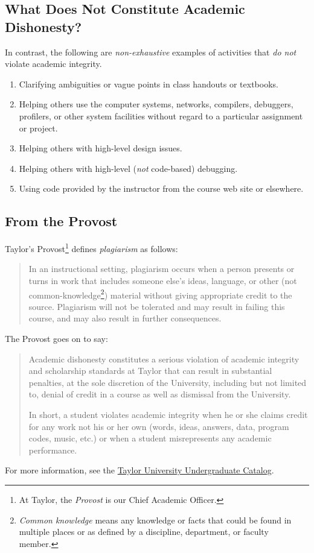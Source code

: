 \subsection{What Does Not Constitute Academic Dishonesty?}

In contrast, the following are \emph{non-exhaustive} examples of activities
that \emph{do not} violate academic integrity.

\begin{enumerate}
\item Clarifying ambiguities or vague points in class handouts or textbooks.
\item Helping others use the computer systems, networks, compilers, debuggers,
  profilers, or other system facilities without regard to a particular assignment or project.
\item Helping others with high-level design issues.
\item Helping others with high-level (\emph{not} code-based) debugging.
\item Using code provided by the instructor from the course web site or elsewhere.
\end{enumerate}

\subsection{From the Provost}

Taylor's Provost\footnote{At Taylor, the \emph{Provost} is our Chief Academic Officer.}
defines \emph{plagiarism} as follows:
\begin{quote}
  In an instructional setting,
  plagiarism occurs when a person presents or turns in work
  that includes someone else's ideas, language,
  or other (not common-knowledge\footnote{\emph{Common knowledge}
    means any knowledge or facts that could be found in multiple places
    or as defined by a discipline, department, or faculty member.}) material
  without giving appropriate credit to the source.
  Plagiarism will not be tolerated
  and may result in failing this course,
  and may also result in further consequences.
\end{quote}

The Provost goes on to say:
\begin{quote}
  Academic dishonesty constitutes a serious violation
  of academic integrity and scholarship standards at Taylor
  that can result in substantial penalties,
  at the sole discretion of the University,
  including but not limited to,
  denial of credit in a course as well as dismissal from the University.

  In short, a student violates academic integrity
  when he or she claims credit for any work not his or her own
  (words, ideas, answers, data, program codes, music, etc.)
  or when a student misrepresents any academic performance.
\end{quote}

For more information, see the
\href{http://www.taylor.edu/academics/files/undergrad-catalog/current/catalog.pdf}%
{Taylor University Undergraduate Catalog}.


